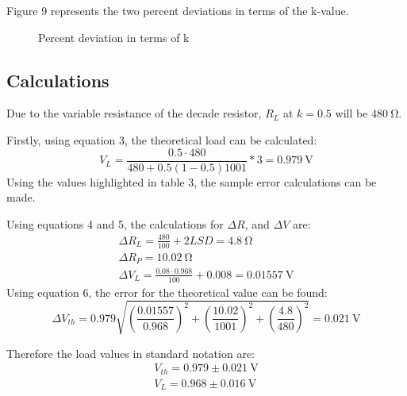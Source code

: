 \documentclass[a4paper]{article}
\newcommand{\unit}[1]{~\mathrm{#1}}
\begin{document}
\newpage
Figure 9 represents the two percent deviations in terms of the k-value.
\begin{figure}[!ht]
    \centering
    \label{fig:9}
    \caption{Percent deviation in terms of k}
\end{figure}
\subsection{Calculations}
Due to the variable resistance of the decade resistor, $R_L$ at $ k = 0.5$ will
be $480\unit{\Omega}$.

Firstly, using equation 3, the theoretical load can be calculated:
\[ V_L = \frac{0.5 \cdot 480}{480 + 0.5(1-0.5)1001} * 3 = 0.979\unit{V}\]
Using the values highlighted in table 3, the sample error calculations can be made.

Using equations 4 and 5, the calculations for $\Delta R$, and $\Delta V$ are:
\begin{gather*}
    \Delta R_L = \frac{480}{100} + 2LSD = 4.8\unit{\Omega}\\
    \Delta R_P = 10.02\unit{\Omega}\\
    \Delta V_L = \frac{0.08 \cdot 0.968}{100} + 0.008 = 0.01557\unit{V}
\end{gather*}
Using equation 6, the error for the theoretical value can be found:
\[ \Delta V_{th} = 0.979 \sqrt{\left( \frac{0.01557}{0.968} \right) ^2 + \left(
\frac{10.02}{1001} \right) ^2 + \left( \frac{4.8}{480} \right) ^2} = 0.021
\unit{V}\]

Therefore the load values in standard notation are:
\begin{gather*}
    V_{th} = 0.979 \pm 0.021\unit{V}\\
    V_L = 0.968 \pm 0.016\unit{V}
\end{gather*}
\end{document}
